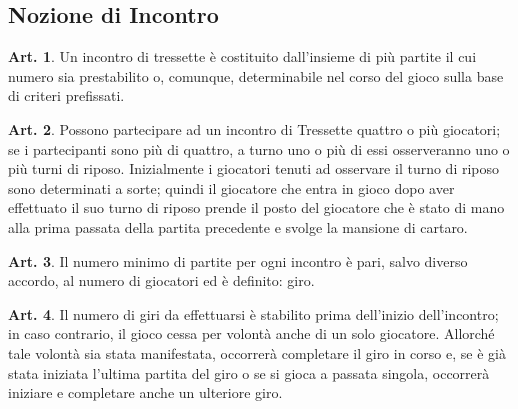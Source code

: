 \documentclass[italian,a4paper]{article}
\theoremstyle{definition}
\newtheorem{art}{Art.}
\begin{document}
\subsection{Nozione di Incontro}
\begin{art}
Un incontro di tressette è costituito dall'insieme di più partite il cui numero sia prestabilito o, comunque, determinabile nel corso del gioco sulla base di criteri prefissati.
\end{art}
\begin{art}
Possono partecipare ad un incontro di Tressette quattro o più giocatori; se i partecipanti sono più di quattro, a turno uno o più di essi osserveranno uno o più turni di riposo. Inizialmente i giocatori tenuti ad osservare il turno di riposo sono determinati a sorte; quindi il giocatore che entra in gioco dopo aver effettuato il suo turno di riposo prende il posto del giocatore che è stato di mano alla prima passata della partita precedente e svolge la mansione di cartaro.
\end{art}
\begin{art}
Il numero minimo di partite per ogni incontro è pari, salvo diverso accordo, al numero di giocatori ed è definito: giro.
\end{art}
\begin{art}
Il numero di giri da effettuarsi è stabilito prima dell'inizio dell'incontro; in caso contrario, il gioco cessa per volontà anche di un solo giocatore. Allorché tale volontà sia stata manifestata, occorrerà completare il giro in corso e, se è già stata iniziata l'ultima partita del giro o se si gioca a passata singola, occorrerà  iniziare e completare anche un ulteriore giro.
\end{art}
\end{document}
